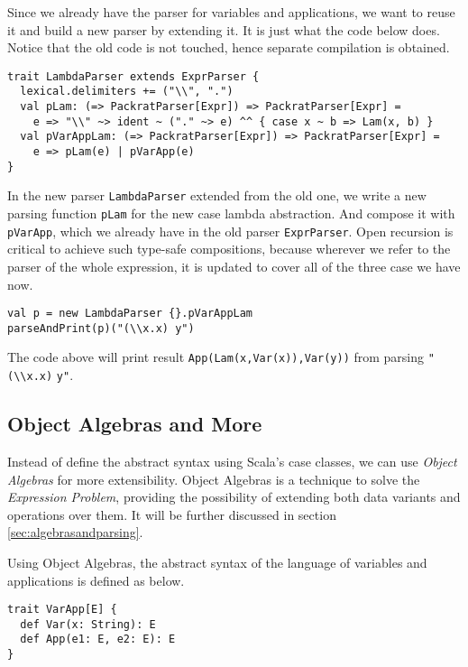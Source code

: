 Since we already have the parser for variables and applications, we want to reuse it and build a new parser by extending it. It is just what the code below does. Notice that the old code is not touched, hence separate compilation is obtained.

\begin{lstlisting}
trait LambdaParser extends ExprParser {
  lexical.delimiters += ("\\", ".")
  val pLam: (=> PackratParser[Expr]) => PackratParser[Expr] =
    e => "\\" ~> ident ~ ("." ~> e) ^^ { case x ~ b => Lam(x, b) }
  val pVarAppLam: (=> PackratParser[Expr]) => PackratParser[Expr] =
    e => pLam(e) | pVarApp(e)
}
\end{lstlisting}

In the new parser \lstinline{LambdaParser} extended from the old one, we write a new parsing function \lstinline{pLam} for the new case lambda abstraction. And compose it with \lstinline{pVarApp}, which we already have in the old parser \lstinline{ExprParser}. Open recursion is critical to achieve such type-safe compositions, because wherever we refer to the parser of the whole expression, it is updated to cover all of the three case we have now.

\begin{lstlisting}
val p = new LambdaParser {}.pVarAppLam
parseAndPrint(p)("(\\x.x) y")
\end{lstlisting}

The code above will print result \lstinline{App(Lam(x,Var(x)),Var(y))} from parsing \lstinline{"(\\x.x)} \lstinline{y"}.

\subsection{Object Algebras and More}\label{subsec:overview-oa}

Instead of define the abstract syntax using Scala's case classes, we can use \textit{Object Algebras} for more extensibility. Object Algebras is a technique to solve the \textit{Expression Problem}, providing the possibility of extending both data variants and operations over them. It will be further discussed in section \ref{sec:algebrasandparsing}.

Using Object Algebras, the abstract syntax of the language of variables and applications is defined as below.

\begin{lstlisting}
trait VarApp[E] {
  def Var(x: String): E
  def App(e1: E, e2: E): E
}
\end{lstlisting}


